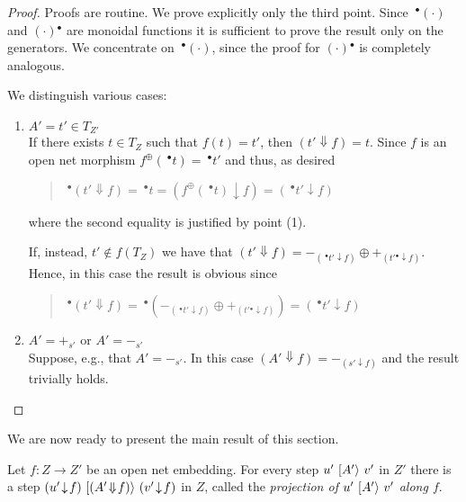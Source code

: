 \documentclass{LMCS}
\newcommand{\mon}[1]{\ensuremath{{#1}^\oplus}}
\newcommand{\res}[2]{\ensuremath{({#1}\!\downarrow\!{#2})}}
\newcommand{\sres}[2]{\ensuremath{({#1}\!\Downarrow\!{#2})}}
\newcommand{\pre}[1][(\cdot)]{\ensuremath{\!~^\bullet{#1}}}
\newcommand{\post}[1][(\cdot)]{\ensuremath{{#1} {^\bullet}}}
\newcommand{\trans}[1]{\ensuremath{\ [\/{#1}\/\rangle}\ }
\begin{document}
\begin{proof}
  Proofs are routine. We prove explicitly only the third point. Since
  $\pre$ and $\post$ are monoidal functions it is sufficient to prove
  the result only on the generators.  We concentrate on $\pre$, since
  the proof for $\post$ is completely analogous.

  We distinguish various cases:

  \begin{enumerate}[$\bullet$]

  \item $A' = t' \in T_{Z'}$\\
    If there exists $t \in T_Z$ such that $f(t) = t'$, then $\sres{t'}{f} =
    t$. Since $f$ is an open net morphism $\mon{f}(\pre[t]) = \pre[t']$ and
    thus, as desired
    \begin{quote}
      $\pre[\sres{t'}{f}] = \pre[t] = \res{\mon{f}(\pre[t])}{f} =
      \res{\pre[t']}{f}$
    \end{quote}
    where the second equality is justified by point (1).
    
    If, instead, $t' \not\in f(T_{Z})$ we have that 
    $\sres{t'}{f} =  -_{\res{\pre[t']}{f}} \oplus +_{\res{\post[t']}{f}}$.
    Hence, in this case the result is obvious since
    \begin{quote}
      $\pre[\sres{t'}{f}] = \pre[(-_{\res{\pre[t']}{f}} \oplus
      +_{\res{\post[t']}{f}})] = \res{\pre[t']}{f}$
    \end{quote}
    
    
  \item $A' = +_{s'}$ or $A' = -_{s'}$\\
    Suppose, e.g., that $A' = -_{s'}$. In this case $\sres{A'}{f} =
    -_{\res{s'}{f}}$ and the result trivially holds.
  \end{enumerate}
\end{proof}

We are now ready to present the main result of this section.

\begin{lem}
  \label{le:reflect}
  Let $f: Z \to Z'$ be an open net embedding.  For every step $u' \trans{A'}
  v'$ in $Z'$ there is a step $\res{u'}{f} \trans{\sres{A'}{f}}
  \res{v'}{f}$ in $Z$, called the \emph{projection of $u'
  \trans{A'} v'$ along $f$}.
\end{lem}
\end{document}
